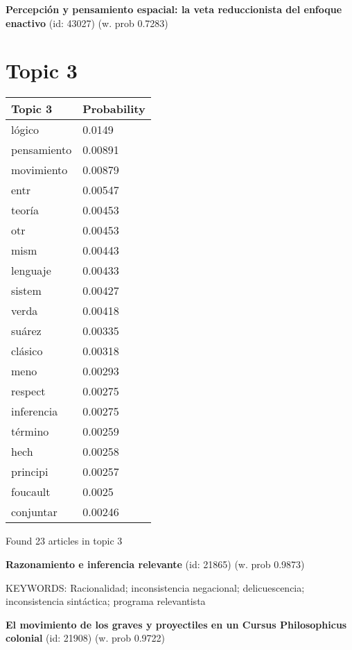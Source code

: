 \documentclass{article}
\begin{document}
\textbf{Percepción y pensamiento espacial: la veta reduccionista del enfoque enactivo} (id: 43027)
 (w. prob 0.7283)

\vfill
\newpage


\centering
\thispagestyle{empty}
\section*{Topic 3}\vfill
\begin{tabular}{ll}
\toprule
     Topic 3 & Probability \\
\midrule
      lógico &      0.0149 \\
 pensamiento &     0.00891 \\
  movimiento &     0.00879 \\
        entr &     0.00547 \\
      teoría &     0.00453 \\
         otr &     0.00453 \\
        mism &     0.00443 \\
    lenguaje &     0.00433 \\
      sistem &     0.00427 \\
       verda &     0.00418 \\
      suárez &     0.00335 \\
     clásico &     0.00318 \\
        meno &     0.00293 \\
     respect &     0.00275 \\
  inferencia &     0.00275 \\
     término &     0.00259 \\
        hech &     0.00258 \\
    principi &     0.00257 \\
    foucault &      0.0025 \\
   conjuntar &     0.00246 \\
\bottomrule
\end{tabular}

\vfill
Found 23 articles in topic 3
\vfill

\textbf{Razonamiento e inferencia relevante} (id: 21865)
 (w. prob 0.9873)


KEYWORDS:
Racionalidad; inconsistencia negacional; delicuescencia; inconsistencia sintáctica; programa relevantista
\vfill

\textbf{El movimiento de los graves y proyectiles en un Cursus Philosophicus colonial} (id: 21908)
 (w. prob 0.9722)
\end{document}
